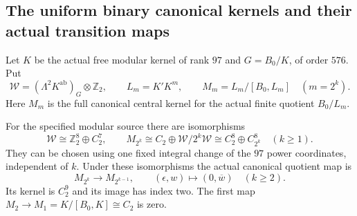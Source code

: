 \subsection{The uniform binary canonical kernels and their actual transition maps}

Let $K$ be the actual free modular kernel of rank $97$ and
$G=B_0/K$, of order $576$. Put
\[
 \mathcal W=
   (\Lambda^2 K^{\mathrm{ab}})_G\otimes\mathbb Z_2,
 \qquad L_m=K'K^m,\qquad
 M_m=L_m/[B_0,L_m]\quad(m=2^k).
                                                        \tag{UCM.1}
\]
Here $M_m$ is the full canonical central kernel for the
actual finite quotient $B_0/L_m$.

\begin{lemma}
For the specified modular source there are isomorphisms
\[
 \mathcal W\cong\mathbb Z_2^8\oplus C_2^7,
 \qquad
 M_{2^k}\cong C_2\oplus\mathcal W/2^k\mathcal W
             \cong C_2^8\oplus C_{2^k}^8\quad(k\geq1).
                                                        \tag{UCM.2}
\]
They can be chosen using one fixed integral change of the
$97$ power coordinates, independent of $k$. Under these
isomorphisms the actual canonical quotient map is
\[
 M_{2^k}\longrightarrow M_{2^{k-1}},\qquad
   (\epsilon,w)\longmapsto(0,\overline w)\quad(k\geq2).
                                                        \tag{UCM.3}
\]
Its kernel is $C_2^9$ and its image has index two.
The first map $M_2\to M_1=K/[B_0,K]\cong C_2$ is zero.
\end{lemma}

